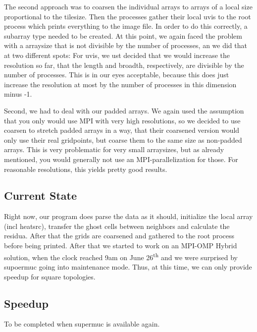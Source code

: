 The second approach was to coarsen the individual arrays to arrays of a local size proportional to the tilesize. Then the processes gather their local uvis to the root process which prints everything to the image file. 
In order to do this correctly, a subarray type needed to be created. At this point, we again faced the problem with a arraysize that is not divisible by the number of processes, an we did that at two different spots: For uvis, we ust decided that we would increase the resolution so far, that the length and broadth, respectively, are divisible by the number of processes. This is in our eyes acceptable, because this does just increase the resolution at most by the number of processes in this dimension minus -1.

Second, we had to deal with our padded arrays. We again used the assumption that you only would use MPI with very high resolutions, so we decided to use coarsen to stretch padded arrays in a way, that their coarsened version would only use their real gridpoints, but coarse them to the same size as non-padded arrays. This is very problematic for very small arraysizes, but as already mentioned, you would generally not use an MPI-parallelization for those. For reasonable resolutions, this yields pretty good results.

\subsection*{Current State}
Right now, our program does parse the data as it should, initialize the local array (incl heatsrc), transfer the ghost cells between neighbors and calculate the residua. After that the grids are coarsened and gathered to the root process before being printed.
After that we started to work on an MPI-OMP Hybrid solution, when the clock reached 9am on June 26\textsuperscript{th} and we were surprised by supoermuc going into maintenance mode. Thus, at this time, we can only provide speedup for square topologies.


\subsection*{Speedup}

To be completed when supermuc is available again.

